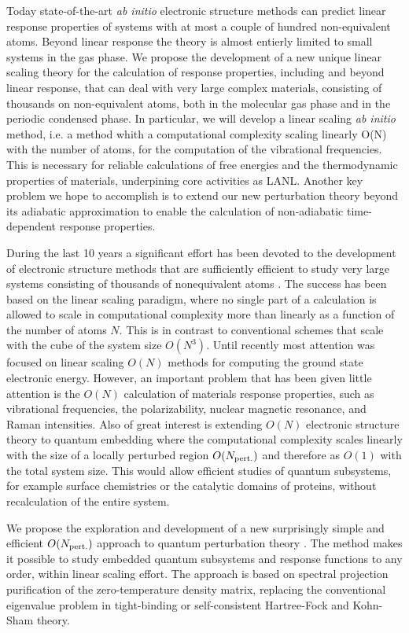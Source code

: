 Today state-of-the-art {\em ab initio} electronic structure
methods can predict linear response properties of systems with
at most a couple of hundred non-equivalent atoms. Beyond linear
response the theory is almost entierly limited to small systems in the
gas phase.  We propose the development of a new unique linear scaling 
theory for the calculation of response properties, including and beyond linear 
response, that can deal with very large complex materials, consisting 
of thousands on non-equivalent atoms, both in the molecular gas 
phase and in the periodic condensed phase. In particular, we
will develop a linear scaling {\em ab initio} method, i.e. a method 
whith a computational complexity scaling linearly O(N) with the
number of atoms, for the computation of the vibrational
frequencies. This is necessary for reliable calculations of 
free energies and the thermodynamic properties of materials,
underpining core activities as LANL. Another key problem
we hope to accomplish is to extend our new perturbation 
theory beyond its adiabatic approximation to enable the calculation
of non-adiabatic time-dependent response properties.

During the last 10 years a significant effort has been devoted to 
the development of electronic structure methods that are sufficiently 
efficient to study very large systems consisting of thousands
of nonequivalent atoms \cite{Goedecker}. The success has been based on 
the linear scaling paradigm, where no single part of a calculation is 
allowed to scale in computational complexity more than linearly as a 
function of the number of atoms $N$. This is in contrast to
conventional schemes that scale with the
cube of the system size $O(N^3)$.  Until recently most attention
was focused on linear scaling $O(N)$ methods for computing the
ground state electronic energy.  However, an important problem
that has been given little attention is the $O(N)$ calculation of materials
response properties, such as vibrational frequencies, the polarizability, 
nuclear magnetic resonance, and Raman intensities. Also of great interest 
is extending $O(N)$ electronic structure theory to quantum embedding 
where the computational complexity scales linearly with the size of a 
locally perturbed region $O(N_{\rm pert.})$ and therefore as $O(1)$ 
with the total system size. This would allow efficient studies of 
quantum subsystems, for example surface chemistries or the catalytic 
domains of proteins, without recalculation of the entire system.

We propose the exploration and development of a new surprisingly 
simple and efficient $O(N_{\rm pert.})$ approach to quantum perturbation 
theory \cite{NiklassonPRT}.  The method makes it possible to study embedded 
quantum subsystems and response functions to any order, within linear scaling effort.
The approach is based on spectral projection purification of the zero-temperature 
density matrix, replacing the conventional eigenvalue problem in tight-binding or 
self-consistent Hartree-Fock and Kohn-Sham theory.

